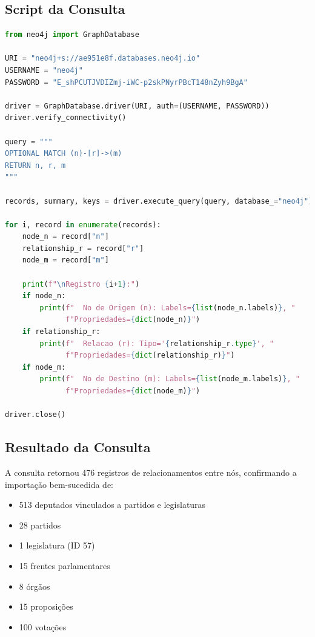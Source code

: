 \documentclass[12pt,a4paper]{article}
\begin{document}
\subsection{Script da Consulta}

\begin{lstlisting}[language=Python,caption=Consulta de verificação em main.ipynb]
from neo4j import GraphDatabase

URI = "neo4j+s://ae951e8f.databases.neo4j.io"
USERNAME = "neo4j"
PASSWORD = "E_shPCUTJVDIZmj-iWC-p2skPNyrPBcT148nZyh9BgA"

driver = GraphDatabase.driver(URI, auth=(USERNAME, PASSWORD))
driver.verify_connectivity()

query = """
OPTIONAL MATCH (n)-[r]->(m)
RETURN n, r, m
"""

records, summary, keys = driver.execute_query(query, database_="neo4j")

for i, record in enumerate(records):
    node_n = record["n"]
    relationship_r = record["r"]
    node_m = record["m"]
    
    print(f"\nRegistro {i+1}:")
    if node_n:
        print(f"  No de Origem (n): Labels={list(node_n.labels)}, "
              f"Propriedades={dict(node_n)}")
    if relationship_r:
        print(f"  Relacao (r): Tipo='{relationship_r.type}', "
              f"Propriedades={dict(relationship_r)}")
    if node_m:
        print(f"  No de Destino (m): Labels={list(node_m.labels)}, "
              f"Propriedades={dict(node_m)}")

driver.close()
\end{lstlisting}

\subsection{Resultado da Consulta}

A consulta retornou 476 registros de relacionamentos entre nós, confirmando a importação bem-sucedida de:

\begin{itemize}
    \item 513 deputados vinculados a partidos e legislaturas
    \item 28 partidos
    \item 1 legislatura (ID 57)
    \item 15 frentes parlamentares
    \item 8 órgãos
    \item 15 proposições
    \item 100 votações
\end{itemize}
\end{document}

